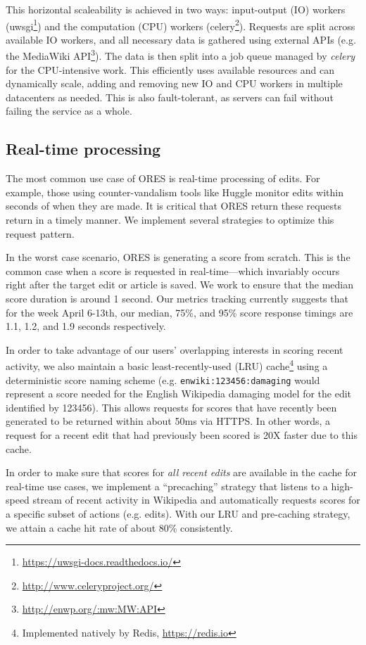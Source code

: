 This horizontal scaleability is achieved in two ways: input-output (IO) workers (uwsgi\footnote{\url{https://uwsgi-docs.readthedocs.io/}}) and the computation (CPU) workers (celery\footnote{\url{http://www.celeryproject.org/}}).  Requests are split across available IO workers, and all necessary data is gathered using external APIs (e.g. the MediaWiki API\footnote{\url{http://enwp.org/:mw:MW:API}}).  The data is then split into a job queue managed by \emph{celery} for the CPU-intensive work.  This efficiently uses available resources and can dynamically scale, adding and removing new IO and CPU workers in multiple datacenters as needed.  This is also fault-tolerant, as servers can fail without failing the service as a whole.

\subsection{Real-time processing}
The most common use case of ORES is real-time processing of edits.  For example, those using counter-vandalism tools like Huggle monitor edits within seconds of when they are made.  It is critical that ORES return these requests return in a timely manner.  We implement several strategies to optimize this request pattern.

In the worst case scenario, ORES is generating a score from scratch.  This is the common case when a score is requested in real-time---which invariably occurs right after the target edit or article is saved.  We work to ensure that the median score duration is around 1 second.  Our metrics tracking currently suggests that for the week April 6-13th, our median, 75\%, and 95\% score response timings are 1.1, 1.2, and 1.9 seconds respectively.

In order to take advantage of our users' overlapping interests in scoring recent activity, we also maintain a basic least-recently-used (LRU) cache\footnote{Implemented natively by Redis, \url{https://redis.io}} using a deterministic score naming scheme (e.g. \texttt{enwiki:123456:damaging} would represent a score needed for the English Wikipedia damaging model for the edit identified by 123456).  This allows requests for scores that have recently been generated to be returned within about 50ms via HTTPS.  In other words, a request for a recent edit that had previously been scored is 20X faster due to this cache.

In order to make sure that scores for \emph{all recent edits} are available in the cache for real-time use cases, we implement a ``precaching'' strategy that listens to a high-speed stream of recent activity in Wikipedia and automatically requests scores for a specific subset of actions (e.g. edits).  With our LRU and pre-caching strategy, we attain a cache hit rate of about 80\% consistently.

